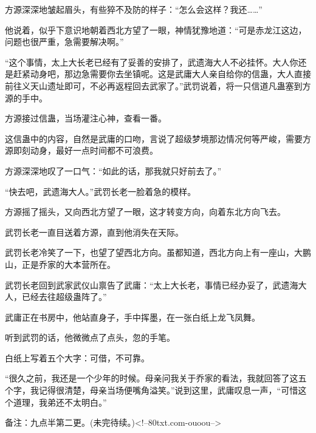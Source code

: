 \begin{this_body}
方源深深地皱起眉头，有些猝不及防的样子：“怎么会这样？我还……”

他说着，似乎下意识地朝着西北方望了一眼，神情犹豫地道：“可是赤龙江这边，问题也很严重，急需要解决啊。”

“这个事情，太上大长老已经有了妥善的安排了，武遗海大人不必挂怀。大人你还是赶紧动身吧，那边急需要你去坐镇呢。这是武庸大人亲自给你的信蛊，大人直接前往义天山遗址即可，不必再返程回去武家了。”武罚说着，将一只信道凡蛊塞到方源的手中。

方源接过信蛊，当场灌注心神，查看一番。

这信蛊中的内容，自然是武庸的口吻，言说了超级梦境那边情况何等严峻，需要方源即刻动身，最好一点时间都不可浪费。

方源深深地叹了一口气：“如此的话，那我就只好前去了。”

“快去吧，武遗海大人。”武罚长老一脸着急的模样。

方源摇了摇头，又向西北方望了一眼，这才转变方向，向着东北方向飞去。

武罚长老一直目送着方源，直到他消失在天际。

武罚长老冷笑了一下，也望了望西北方向。虽都知道，西北方向上有一座山，大鹏山，正是乔家的大本营所在。

武罚长老回到武家武仪山禀告了武庸：“太上大长老，事情已经办妥了，武遗海大人，已经去往超级蛊阵了。”

武庸正在书房中，他站直身子，手中挥墨，在一张白纸上龙飞凤舞。

听到武罚的话，他微微点了点头，忽的手笔。

白纸上写着五个大字：可借，不可靠。

“很久之前，我还是一个少年的时候。母亲问我关于乔家的看法，我就回答了这五个字，我记得很清楚，母亲当场便嘴角溢笑。”说到这里，武庸叹息一声，“可惜这个道理，我弟还不太明白。”

备注：九点半第二更。(未完待续。)<!--80txt.com-ouoou-->

\end{this_body}

